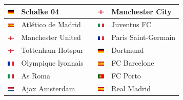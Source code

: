 \documentclass{../ficheTDTP}
\begin{document}
\begin{tabular}{|clccl|}
\hline
\includegraphics[height=0.2cm]{flags/de.png} & Schalke 04 & & \includegraphics[height=0.2cm]{flags/en.png} & Manchester City \\ \hline
\includegraphics[height=0.2cm]{flags/es.png} & Atlético de Madrid & & \includegraphics[height=0.2cm]{flags/it.png} & Juventus FC \\ \hline
\includegraphics[height=0.2cm]{flags/en.png} & Manchester United & & \includegraphics[height=0.2cm]{flags/fr.png} & Paris Saint-Germain \\ \hline
\includegraphics[height=0.2cm]{flags/en.png} & Tottenham Hotspur & & \includegraphics[height=0.2cm]{flags/de.png} & Dortmund \\ \hline
\includegraphics[height=0.2cm]{flags/fr.png} & Olympique lyonnais & & \includegraphics[height=0.2cm]{flags/es.png} & FC Barcelone \\ \hline
\includegraphics[height=0.2cm]{flags/it.png} & As Roma & & \includegraphics[height=0.2cm]{flags/po.png} & FC Porto \\ \hline
\includegraphics[height=0.2cm]{flags/nl.png} & Ajax Amsterdam & & \includegraphics[height=0.2cm]{flags/es.png} & Real Madrid \\ \hline

\end{tabular}
\end{document}
